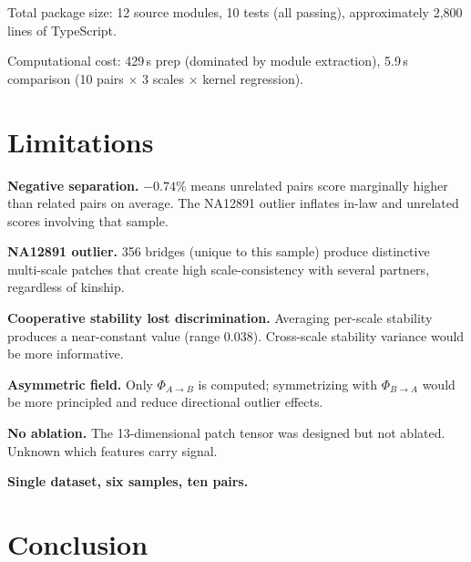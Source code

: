 \documentclass{../yalumba}
\begin{document}
Total package size: 12 source modules, 10 tests (all passing), approximately
2{,}800 lines of TypeScript.

Computational cost: 429\,s prep (dominated by module extraction), 5.9\,s
comparison (10 pairs $\times$ 3 scales $\times$ kernel regression).


\section{Limitations}
\label{sec:limitations}

\begin{limitation}
\textbf{Negative separation.}  $-0.74\%$ means unrelated pairs score
marginally higher than related pairs on average.  The NA12891 outlier
inflates in-law and unrelated scores involving that sample.
\end{limitation}

\begin{limitation}
\textbf{NA12891 outlier.}  356 bridges (unique to this sample) produce
distinctive multi-scale patches that create high scale-consistency with
several partners, regardless of kinship.
\end{limitation}

\begin{limitation}
\textbf{Cooperative stability lost discrimination.}  Averaging per-scale
stability produces a near-constant value (range 0.038).  Cross-scale
stability variance would be more informative.
\end{limitation}

\begin{limitation}
\textbf{Asymmetric field.}  Only $\Phi_{A \to B}$ is computed; symmetrizing
with $\Phi_{B \to A}$ would be more principled and reduce directional
outlier effects.
\end{limitation}

\begin{limitation}
\textbf{No ablation.}  The 13-dimensional patch tensor was designed but not
ablated.  Unknown which features carry signal.
\end{limitation}

\begin{limitation}
\textbf{Single dataset, six samples, ten pairs.}
\end{limitation}


\section{Conclusion}
\label{sec:conclusion}
\end{document}
